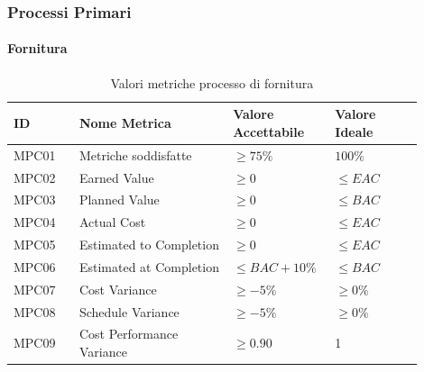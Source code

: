 \documentclass[a4paper,12pt]{article}
\begin{document}
            \subsubsection{Processi Primari}
                \paragraph{Fornitura} \mbox{}
                    \begin{longtable}{|M{0.15\linewidth}|M{0.35\linewidth}|M{0.2\linewidth}|M{0.2\linewidth}|}

                        \caption{Valori metriche processo di fornitura} \\
                        \hline
                        \textbf{ID} & \textbf{Nome Metrica} & \textbf{Valore Accettabile} & \textbf{Valore Ideale} \\
                        \hline
                        \endhead

                        MPC01 & Metriche soddisfatte & $\ge 75\%$ & $100\%$ \\
                        \hline

                        MPC02 & Earned Value & $\ge 0$ & $\le EAC$ \\
                        \hline
                        
                        MPC03 & Planned Value & $\ge 0$ & $\le BAC$ \\
                        \hline
                        
                        MPC04 & Actual Cost & $\ge 0$ & $\le EAC$\\
                        \hline
                        
                        MPC05 & Estimated to Completion & $\ge 0$ & $\le EAC$ \\
                        \hline

                        MPC06 & Estimated at Completion & $\le BAC + 10\%$ & $\le BAC$ \\
                        \hline

                        MPC07 & Cost Variance & $\ge -5\%$ & $\ge 0\%$\\
                        \hline

                        MPC08 & Schedule Variance & $\ge -5\%$ & $\ge 0\%$\\
                        \hline

                        MPC09 & Cost Performance Variance & $\ge 0.90$ & 1 \\
                        \hline

                    \end{longtable}
\end{document}
